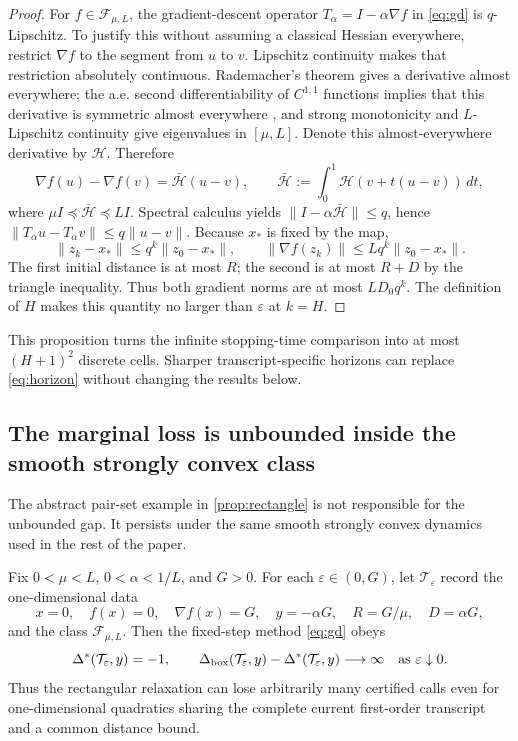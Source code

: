 \documentclass[smallextended]{svjour3}
\newcommand{\cF}{\mathcal{F}}
\newcommand{\cT}{\mathcal{T}}
\newcommand{\norm}[1]{\lVert #1\rVert}
\newcommand{\eps}{\varepsilon}
\begin{document}
\begin{proof}
For $f\in\cF_{\mu,L}$, the gradient-descent operator
$T_\alpha=I-\alpha\nabla f$ in \eqref{eq:gd} is $q$-Lipschitz.  To justify
this without assuming a classical Hessian everywhere, restrict $\nabla f$ to
the segment from $u$ to $v$.  Lipschitz continuity makes that restriction
absolutely continuous.  Rademacher's theorem gives a derivative almost
  everywhere; the a.e. second differentiability of $C^{1,1}$ functions implies
  that this derivative is symmetric almost everywhere
  \citep[Sec.~6.3]{EvansGariepy2015}, and strong monotonicity and
$L$-Lipschitz continuity give eigenvalues in $[\mu,L]$.  Denote this
almost-everywhere derivative by $\mathcal H$.  Therefore
\[
 \nabla f(u)-\nabla f(v)=\bar{\mathcal H}(u-v),\qquad
 \bar{\mathcal H}:=\int_0^1 \mathcal H(v+t(u-v))\,dt,
\]
where $\mu I\preceq\bar{\mathcal H}\preceq LI$.  Spectral calculus yields
$\norm{I-\alpha\bar{\mathcal H}}\leq q$, hence
$\norm{T_\alpha u-T_\alpha v}\leq q\norm{u-v}$.  Because
$x_*$ is fixed by the map,
\[
 \norm{z_k-x_*}\leq q^k\norm{z_0-x_*},
 \qquad
 \norm{\nabla f(z_k)}\leq Lq^k\norm{z_0-x_*}.
\]
The first initial distance is at most $R$; the second is at most $R+D$ by the
triangle inequality.  Thus both gradient norms are at most $LD_0q^k$.
The definition of $H$ makes this quantity no larger than $\eps$ at $k=H$.
\end{proof}

This proposition turns the infinite stopping-time comparison into at most
$(H+1)^2$ discrete cells.  Sharper transcript-specific horizons can replace
\eqref{eq:horizon} without changing the results below.

\subsection{The marginal loss is unbounded inside the smooth strongly convex class}

The abstract pair-set example in \cref{prop:rectangle} is not responsible for
the unbounded gap.  It persists under the same smooth strongly convex dynamics
used in the rest of the paper.

\begin{theorem}
\label{thm:class-gap}
Fix $0<\mu<L$, $0<\alpha<1/L$, and $G>0$.  For each
$\eps\in(0,G)$, let $\cT_\eps$ record the one-dimensional data
\begin{equation}
 x=0,\quad f(x)=0,\quad \nabla f(x)=G,\quad
 y=-\alpha G,\quad R=G/\mu,\quad D=\alpha G,          \label{eq:gap-transcript}
\end{equation}
and the class $\cF_{\mu,L}$.  Then the fixed-step method \eqref{eq:gd} obeys
\begin{equation}
 \Delta^*(\cT_\eps,y)=-1,\qquad
 \Delta_{\rm box}(\cT_\eps,y)-\Delta^*(\cT_\eps,y)
 \longrightarrow\infty\quad\text{as }\eps\downarrow0.            \label{eq:class-gap}
\end{equation}
Thus the rectangular relaxation can lose arbitrarily many certified calls
even for one-dimensional quadratics sharing the complete current first-order
transcript and a common distance bound.
\end{theorem}
\end{document}
